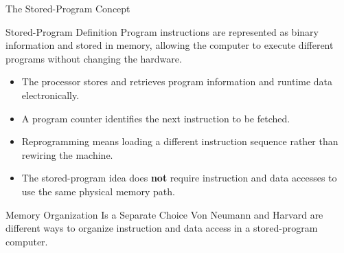 \documentclass[aspectratio=169,11pt,t]{beamer}
\newcommand{\key}[1]{\textbf{#1}}
\begin{document}

\begin{frame}{The Stored-Program Concept}

\begin{block}{Stored-Program Definition}
Program instructions are represented
as binary information
and stored in memory,
allowing the computer
to execute different programs
without changing the hardware.
\end{block}

\vspace{0.12cm}

\begin{itemize}
  \item The processor stores and retrieves
        program information
        and runtime data electronically.
  \item A program counter identifies
        the next instruction to be fetched.
  \item Reprogramming means loading
        a different instruction sequence
        rather than rewiring the machine.
  \item The stored-program idea does
        \key{not} require instruction
        and data accesses
        to use the same physical memory path.
\end{itemize}

\vspace{0.05cm}

\begin{block}{Memory Organization Is a Separate Choice}
Von Neumann and Harvard
are different ways
to organize instruction
and data access
in a stored-program computer.
\end{block}

\end{frame}



\end{document}
